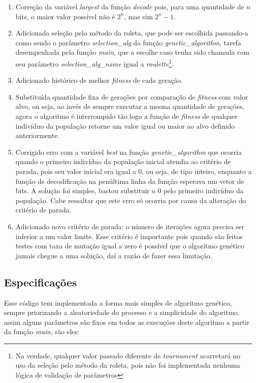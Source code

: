 \documentclass[12pt]{article}
\begin{document}
\begin{enumerate}
    \item Correção da variável \textit{largest} da função \textit{decode} pois, para uma quantidade de $n$ bits, o maior valor possível não é $2^n$, mas sim $2^n-1$.
    \item Adicionada seleção pelo método da roleta, que pode ser escolhida passando-a como sendo o parâmetro \textit{selection\_alg} da função \textit{genetic\_algorithm}, tarefa desempenhada pela função \textit{main}, que a escolhe caso tenha sido chamada com seu parâmetro \textit{selection\_alg\_name} igual a \textit{roulette}\footnote{Na verdade, qualquer valor passado diferente de \textit{tournament} acarretará no uso da seleção pelo método da roleta, pois não foi implementada nenhuma lógica de validação de parâmetros}.
    \item Adicionado histórico de melhor \textit{fitness} de cada geração.
    \item Substituída quantidade fixa de gerações por comparação de \textit{fitness} com valor alvo, ou seja, ao invés de sempre executar a mesma quantidade de gerações, agora o algoritmo é interrompido tão logo a função de \textit{fitness} de qualquer indivíduo da população retorne um valor igual ou maior ao alvo definido anteriormente.
    \item Corrigido erro com a variável \textit{best} na função \textit{genetic\_algorithm} que ocorria quando o primeiro indivíduo da população inicial atendia ao critério de parada, pois seu valor inicial era igual a 0, ou seja, de tipo inteiro, enquanto a função de decodificação na penúltima linha da função esperava um vetor de bits. A solução foi simples, bastou substituir o 0 pelo primeiro indivíduo da população. Cabe ressaltar que este erro só ocorria por causa da alteração do critério de parada.
    \item Adicionado novo critério de parada: o número de iterações agora precisa ser inferior a um valor limite. Esse critério é importante pois quando são feitos testes com taxa de mutação igual a zero é possível que o algoritmo genético jamais chegue a uma solução, daí a razão de fazer essa limitação.
\end{enumerate}

\subsection{Especificações}

Esse código tem implementada a forma mais simples de algoritmo genético, sempre priorizando a aleatoriedade do processo e a simplicidade do algoritmo, assim alguns parâmetros são fixos em todos as execuções deste algoritmo a partir da função \textit{main}, são eles:
\end{document}
